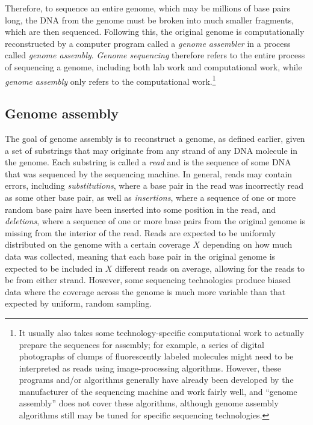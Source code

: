\documentclass[10pt]{article}
\begin{document}
Therefore, to sequence an entire genome, which may be millions of
base pairs long, the DNA from the genome must be broken into much smaller
fragments, which are then sequenced.  Following this, the original genome is
computationally reconstructed by a computer program called a {\it genome
assembler} in a process called {\it genome assembly}.  {\it Genome sequencing}
therefore refers to the entire process of sequencing a genome, including both
lab work and computational work, while {\it genome assembly} only refers to the
computational work.\footnote{It usually also takes some technology-specific
computational work to actually prepare the sequences for assembly; for example,
a series of digital photographs of clumps of fluorescently labeled molecules
might need to be interpreted as reads using image-processing algorithms.
However, these programs and/or algorithms generally have already been developed
by the manufacturer of the sequencing machine and work fairly well, and ``genome
assembly'' does not cover these algorithms, although genome assembly algorithms
still may be tuned for specific sequencing technologies.}

\subsection{Genome assembly}

\label{subsec:reads}

The goal of genome assembly is to reconstruct a genome, as defined earlier,
given a set of substrings that may originate from any strand of any DNA molecule
in the genome.  Each substring is called a {\it read} and is the sequence of
some DNA that was sequenced by the sequencing machine.  In general, reads may
contain errors, including {\it substitutions}, where a base pair in the read was
incorrectly read as some other base pair, as well as {\it insertions}, where a
sequence of one or more random base pairs have been inserted into some position
in the read, and {\it deletions}, where a sequence of one or more base pairs
from the original genome is missing from the interior of the read.  Reads are
expected to be uniformly distributed on the genome with a certain coverage $X$
depending on how much data was collected, meaning that each base pair in the
original genome is expected to be included in $X$ different reads on average,
allowing for the reads to be from either strand.  However, some sequencing
technologies produce biased data where the coverage across the genome is much
more variable than that expected by uniform, random sampling.
\end{document}
